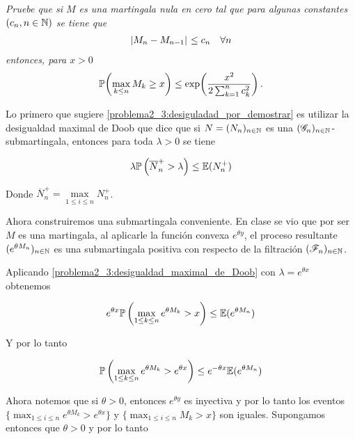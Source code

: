 \emph{
    Pruebe que si $M$ es una martingala nula en cero tal que para algunas constantes $\left( c_n,n\in\mathbb{N}\right) $ se tiene que
    \begin{align}
        \hspace{.25mm}\left|M_n-M_{n-1}\right|\hspace{.25mm}\leq c_n\quad\forall n                                             \label{problema2_3:cota_para_diferencias}
    \end{align}
    entonces, para $x>0$
    \begin{align}
        \mathbb{P}\! \left( \max_{k\leq n} M_k\geq x \right)\leq \exp\!\left( \frac{x^2}{2\sum_{k=1}^n c_k^2}\right) .   \label{problema2_3:desiguladad_por_demostrar}
    \end{align}
}

\afterstatement\pn

Lo primero que sugiere \eqref{problema2_3:desiguladad_por_demostrar} es utilizar la desigualdad maximal de Doob que dice que si $N=(N_n)_{n\in\mathbb{N}}$
es una $(\mathscr{G}_n)_{n\in\mathbb{N}}$-submartingala, entonces para toda $\lambda > 0$ se tiene

\begin{align}
        \lambda \mathbb{P}\left(\overline{N}_n^+ > \lambda \right) \leq \mathbb{E}(N_n^+) \label{problema2_3:desigualdad_maximal_de_Doob}
\end{align}

Donde $\overline{N}_n^+ = \max\limits_{1 \leq i \leq n} N_n^+$.\pn

Ahora construiremos una submartingala conveniente. En clase se vio que por ser $M$ es una martingala, al aplicarle la función convexa $e^{\theta y}$, el
proceso resultante $(e^{\theta M_n})_{n \in \mathbb{N}}$ es una submartingala positiva con respecto de la filtración $(\mathscr{F}_n)_{n\in\mathbb{N}}$.\pn

Aplicando \eqref{problema2_3:desigualdad_maximal_de_Doob} con $\lambda = e^{\theta x}$ obtenemos

\begin{align}
    e^{\theta x} \mathbb{P}\left( \max_{1 \leq k \leq n} e^{\theta M_k} > x \right) \leq \mathbb{E}(e^{\theta M_n})
\end{align}\pn
 
Y por lo tanto

\begin{align}
    \mathbb{P}\left( \max_{1 \leq k \leq n} e^{\theta M_k} > e^{\theta x} \right) \leq e^{- \theta x} \mathbb{E}(e^{\theta M_n})
\end{align}\pn

Ahora notemos que si $\theta > 0$, entonces $e^{\theta y}$ es inyectiva y por lo tanto los eventos
$\{ \max_{1 \leq i \leq n} e^{\theta M_k} > e^{\theta x} \}$ y $\{ \max_{1 \leq i \leq n} M_k > x \}$ son iguales.
Supongamos entonces que $\theta > 0$ y por lo tanto

